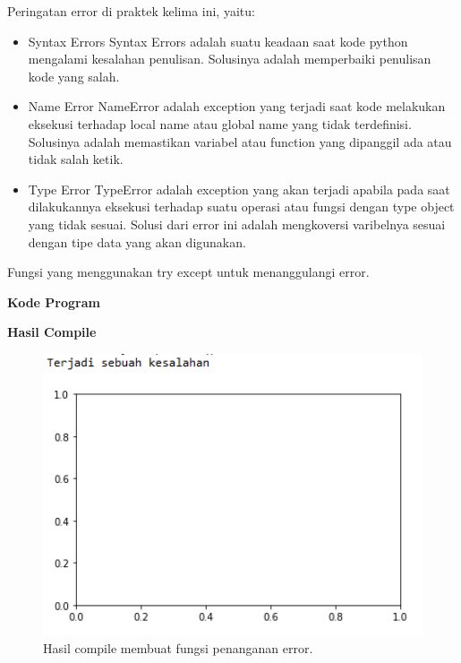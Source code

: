 \hfill \break
Peringatan error di praktek kelima ini, yaitu:
\begin{itemize}
	\item Syntax Errors
	Syntax Errors adalah suatu keadaan saat kode python mengalami kesalahan penulisan. Solusinya adalah memperbaiki penulisan kode yang salah.
	
	\item Name Error
	NameError adalah exception yang terjadi saat kode melakukan eksekusi terhadap local name atau global name yang tidak terdefinisi. Solusinya adalah memastikan variabel atau function yang dipanggil ada atau tidak salah ketik.
	
	\item Type Error
	TypeError adalah exception yang akan terjadi apabila pada saat dilakukannya eksekusi terhadap suatu operasi atau fungsi dengan type object yang tidak sesuai. Solusi dari error ini adalah mengkoversi varibelnya sesuai dengan tipe data yang akan digunakan.
\end{itemize}
\hfill \break
Fungsi yang menggunakan try except untuk menanggulangi error.

\hfill \break
\textbf{Kode Program}



\hfill \break
\textbf{Hasil Compile}

\begin{figure}[H]
	\includegraphics[width=12cm]{figures/6/1174089/Praktek/error.png}
	\centering
	\caption{Hasil compile membuat fungsi penanganan error.}
\end{figure}

